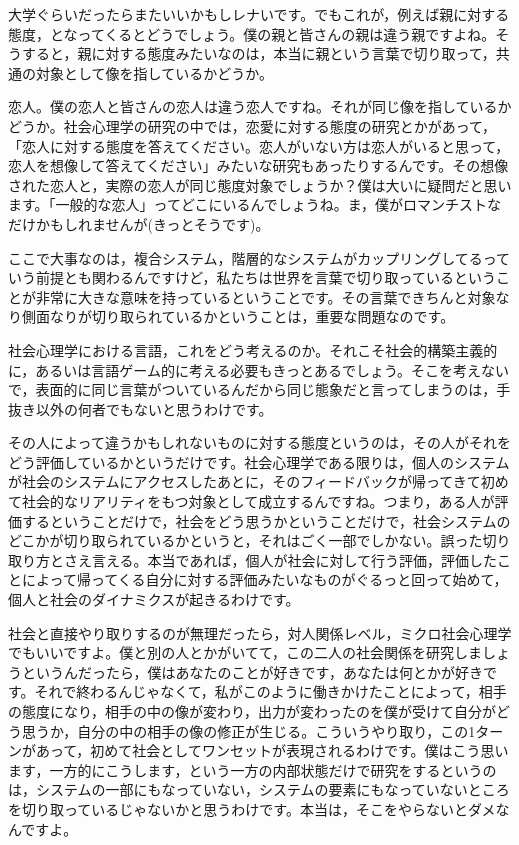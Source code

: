 \documentclass{ltjsbook}
\begin{document}
大学ぐらいだったらまたいいかもしレナいです。でもこれが，例えば親に対する態度，となってくるとどうでしょう。僕の親と皆さんの親は違う親ですよね。そうすると，親に対する態度みたいなのは，本当に親という言葉で切り取って，共通の対象として像を指しているかどうか。

恋人。僕の恋人と皆さんの恋人は違う恋人ですね。それが同じ像を指しているかどうか。社会心理学の研究の中では，恋愛に対する態度の研究とかがあって，「恋人に対する態度を答えてください。恋人がいない方は恋人がいると思って，恋人を想像して答えてください」みたいな研究もあったりするんです。その想像された恋人と，実際の恋人が同じ態度対象でしょうか？僕は大いに疑問だと思います。「一般的な恋人」ってどこにいるんでしょうね。ま，僕がロマンチストなだけかもしれませんが(きっとそうです)。

ここで大事なのは，複合システム，階層的なシステムがカップリングしてるっていう前提とも関わるんですけど，私たちは世界を言葉で切り取っているということが非常に大きな意味を持っているということです。その言葉できちんと対象なり側面なりが切り取られているかということは，重要な問題なのです。

社会心理学における言語，これをどう考えるのか。それこそ社会的構築主義的に，あるいは言語ゲーム的に考える必要もきっとあるでしょう。そこを考えないで，表面的に同じ言葉がついているんだから同じ態象だと言ってしまうのは，手抜き以外の何者でもないと思うわけです。

その人によって違うかもしれないものに対する態度というのは，その人がそれをどう評価しているかというだけです。社会心理学である限りは，個人のシステムが社会のシステムにアクセスしたあとに，そのフィードバックが帰ってきて初めて社会的なリアリティをもつ対象として成立するんですね。つまり，ある人が評価するということだけで，社会をどう思うかということだけで，社会システムのどこかが切り取られているかというと，それはごく一部でしかない。誤った切り取り方とさえ言える。本当であれば，個人が社会に対して行う評価，評価したことによって帰ってくる自分に対する評価みたいなものがぐるっと回って始めて，個人と社会のダイナミクスが起きるわけです。

社会と直接やり取りするのが無理だったら，対人関係レベル，ミクロ社会心理学でもいいですよ。僕と別の人とかがいてて，この二人の社会関係を研究しましょうというんだったら，僕はあなたのことが好きです，あなたは何とかが好きです。それで終わるんじゃなくて，私がこのように働きかけたことによって，相手の態度になり，相手の中の像が変わり，出力が変わったのを僕が受けて自分がどう思うか，自分の中の相手の像の修正が生じる。こういうやり取り，この1ターンがあって，初めて社会としてワンセットが表現されるわけです。僕はこう思います，一方的にこうします，という一方の内部状態だけで研究をするというのは，システムの一部にもなっていない，システムの要素にもなっていないところを切り取っているじゃないかと思うわけです。本当は，そこをやらないとダメなんですよ。
\end{document}
